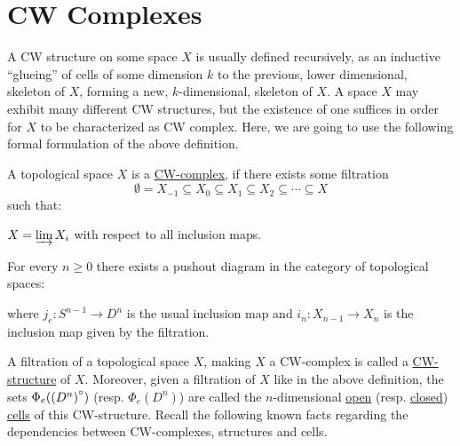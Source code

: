 \chapter{CW Complexes}
A CW structure on some space $X$ is usually defined recursively, as an inductive ``glueing'' of cells of some dimension $k$ to the previous, lower dimensional, skeleton of $X$, forming a new, $k$-dimensional, skeleton of $X$. A space $X$ may exhibit many different CW structures, but the existence of one suffices in order for $X$ to be characterized as CW complex. Here, we are going to use the following formal formulation of the above definition.

\begin{definition} A topological space $X$ is a \ul{CW-complex}, if there exists some filtration
\[\emptyset=X_{-1}\subseteq X_0\subseteq X_1\subseteq X_2\subseteq\cdots\subseteq X\]
such that:
\begin{b_item}
\item $X=\varinjlim X_i$ with respect to all inclusion maps.
\item For every $n\geq0$ there exists a pushout diagram in the category of topological spaces:
\begin{center}
\end{center}
where $j_e:S^{n-1}\to D^n$ is the usual inclusion map and $i_n:X_{n-1}\to X_n$ is the inclusion map given by the filtration.
\end{b_item}
\end{definition}

A filtration of a topological space $X$, making $X$ a CW-complex is called a \ul{CW-structure} of $X$. Moreover, given a filtration of $X$ like in the above definition, the sets $\Phi_e\large({(D^n)}^{\circ}\large)$ (resp. $\Phi_e(D^n)$) are called the $n$-dimensional \ul{open} (resp. \ul{closed}) \ul{cells} of this CW-structure. Recall the following known facts regarding the dependencies between CW-complexes, structures and cells.

